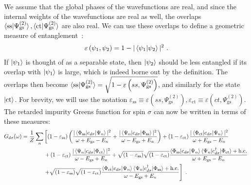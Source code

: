 \documentclass{iopart}
\begin{document}
We assume that the global phases of the wavefunctions are real, and since the internal weights of the wavefunctions are real as well, the overlaps \(\braket{\text{ss}|\Psi^{(2)}_\text{gs}},\braket{\text{ct}|\Psi^{(2)}_\text{gs}}\) are also real. We can use these overlaps to define a geometric measure of entanglement~\cite{shimony1995degree,wei2003geometric,horodecki2009quantum}:
\begin{eqnarray}
	\varepsilon\left(\psi_1,\psi_2\right) = 1 - |\braket{\psi_1 | \psi_2}|^2~.
\end{eqnarray}
If \(\ket{\psi_1}\) is thought of as a separable state, then \(\ket{\psi_2}\) should be less entangled if its overlap with \(\ket{\psi_1}\) is large, which is indeed borne out by the definition.
The overlaps then become \(\braket{\text{ss}|\Psi^{(2)}_\text{gs}} = \sqrt{1 - \varepsilon\left(ss,\Psi^{(2)}_\text{gs}\right)}\), and similarly for the state \(\ket{\text{ct}}\). For brevity, we will use the notation \(\varepsilon_\text{ss} \equiv \varepsilon\left(ss,\Psi^{(2)}_\text{gs}\right), \varepsilon_\text{ct} \equiv \varepsilon\left(ct,\Psi^{(2)}_\text{gs}\right)\). The retarded impurity Greens function for spin \(\sigma\) can now be written in terms of these measures:
\begin{eqnarray}\label{greens_func_entng}
	G_{d\sigma}(\omega) = \frac{1}{Z}\sum_n &\left[\left(1 - \varepsilon_\text{ss} \right) \left(\frac{|\braket{\Phi_\text{ss} | c_{d\sigma} | \Psi_n}|^2}{\omega + E_\text{gs} - E_n} + \frac{|\braket{\Psi_n | c_{d\sigma} | \Phi_\text{ss}}|^2}{\omega - E_\text{gs} + E_n}\right) + \left(1 - \varepsilon_\text{ct} \right) \frac{|\braket{\Phi_\text{ct} | c_{d\sigma} | \Psi_n}|^2}{\omega + E_\text{gs} - E_n}\right.\nonumber\\
		&\left. + \left(1 - \varepsilon_\text{ct} \right)\frac{|\braket{\Psi_n | c_{d\sigma} | \Phi_\text{ct}}|^2}{\omega - E_\text{gs} + E_n} + \sqrt{\left(1 - \varepsilon_\text{ss} \right)}\sqrt{\left(1 - \varepsilon_\text{ct} \right)} \frac{\braket{\Phi_\text{ss} | c_{d\sigma} | \Psi_n}\braket{\Psi_n | c^\dagger_{d\sigma} | \Phi_\text{ct}} + \text{h.c.}}{\omega + E_\text{gs} - E_n} \right. \nonumber\\
		&\left.+ \sqrt{\left(1 - \varepsilon_\text{ss} \right)}\sqrt{\left(1 - \varepsilon_\text{ct} \right)}\frac{\braket{\Phi_\text{ct} | c_{d\sigma} | \Psi_n}\braket{\Psi_n | c^\dagger_{d\sigma} | \Phi_\text{ss}} + \text{h.c.}}{\omega - E_\text{gs} + E_n}\right]~.
\end{eqnarray}
\end{document}
